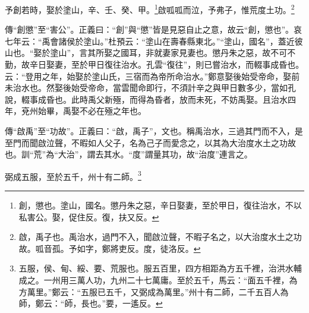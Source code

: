 予創若時，娶於塗山，辛、壬、癸、甲。\footnote{創，懲也。塗山，國名。懲丹朱之惡，辛日娶妻，至於甲日，復往治水，不以私害公。娶，促住反。復，扶又反。}啟呱呱而泣，予弗子，惟荒度土功。\footnote{啟，禹子也。禹治水，過門不入，聞啟泣聲，不暇子名之，以大治度水土之功故。呱音孤。予如字，鄭將吏反。度，徒洛反。}


{\noindent\zhuan{}\fzbyks 傳“創懲”至“害公”。正義曰：“創”與“懲”皆是見惡自止之意，故云“創，懲也”。哀七年云：“禹會諸侯於塗山。”杜預云：“塗山在壽春縣東北。”“塗山，國名”，蓋近彼山也。“娶於塗山”，言其所娶之國耳，非就妻家見妻也。懲丹朱之惡，故不可不勤，故辛日娶妻，至於甲日復往治水。孔雲“復往”，則已嘗治水，而輟事成昏也。云：“登用之年，始娶於塗山氏，三宿而為帝所命治水。”鄭意娶後始受帝命，娶前未治水也。然娶後始受帝命，當雲聞命即行，不須計辛之與甲日數多少，當如孔說，輟事成昏也。此時禹父新殛，而得為昏者，放而未死，不妨禹娶。且治水四年，兗州始畢，禹娶不必在殛之年也。 \par}

{\noindent\zhuan{}\fzbyks 傳“啟禹”至“功故”。正義曰：“啟，禹子”，文也。稱禹治水，三過其門而不入，是至門而聞啟泣聲，不暇如人父子，名為己子而愛念之，以其為大治度水土之功故也。訓“荒”為“大治”，謂去其水。“度”謂量其功，故“治度”連言之。 \par}

弼成五服，至於五千，州十有二師。\footnote{五服，侯、甸、綏、要、荒服也。服五百里，四方相距為方五千裡，治洪水輔成之。一州用三萬人功，九州二十七萬庸。至於五千，馬云：“面五千裡，為方萬里。”鄭云：“五服已五千，又弼成為萬里。”州十有二師，二千五百人為師，鄭云：“師，長也。”要，一遙反。}


